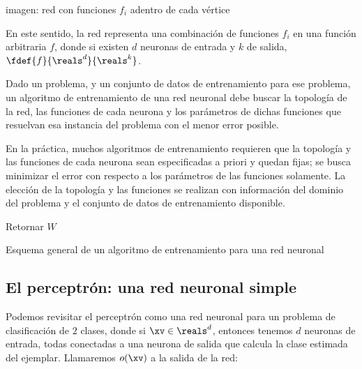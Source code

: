 imagen: red con funciones $f_i$ adentro de cada vértice



En este sentido, la red representa una combinación de funciones $f_i$ en una función arbitraria $f$, donde si existen $d$ neuronas de entrada y $k$ de salida, $\fdef{f}{\reals^d}{\reals^k}$.

Dado un problema, y un conjunto de datos de entrenamiento para ese problema, un algoritmo de entrenamiento de una red neuronal debe buscar la topología de la red, las funciones de cada neurona y los parámetros de dichas funciones que resuelvan esa instancia del problema con el menor error posible.

En la práctica, muchos algoritmos de entrenamiento requieren que la topología y las funciones de cada neurona sean especificadas a priori y quedan fijas; se busca minimizar el error con respecto a los parámetros de las funciones solamente. La elección de la topología y las funciones se realizan con información del dominio del problema y el conjunto de datos de entrenamiento disponible. 


\begin{algorithm}[H]

Retornar $W$
\caption{Esquema general de un algoritmo de entrenamiento para una red neuronal} 
\end{algorithm}


\subsection{El perceptrón: una red neuronal simple}

Podemos revisitar el perceptrón como una red neuronal para un problema de clasificación de $2$ clases, donde si $\xv \in \reals^d$, entonces tenemos $d$ neuronas de  entrada, todas conectadas a una neurona de salida que calcula la clase estimada del ejemplar. Llamaremos $o(\xv)$ a la salida de la red:

